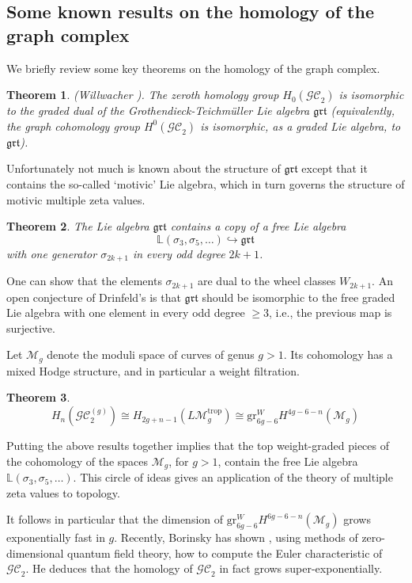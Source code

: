 \documentclass[12pt]{amsart}
\theoremstyle{plain}
\newtheorem{thm}{Theorem}
\newcommand{\LM}{L\mathcal{M}}
\newcommand{\trop}{\mathrm{trop}}
\newcommand{\GC}{\mathcal{GC}}
\newcommand{\0}{\color{blue}{\mathsf{0}}}
\begin{document}
\subsection{Some known results on the homology of the graph complex}
We briefly review some key theorems on  the homology of the graph complex. 
\begin{thm} (Willwacher \cite{WillwacherGRT}). The zeroth homology group $H_0(\GC_2)$ is isomorphic to the graded dual of the Grothendieck-Teichm\"uller Lie algebra $\mathfrak{grt}$ (equivalently, the graph cohomology group $H^0(\GC_2)$ is isomorphic, as a graded Lie algebra, to $\mathfrak{grt}$). 
\end{thm}
Unfortunately not much is known about the structure of $\mathfrak{grt}$ except that it contains the so-called `motivic' Lie algebra, which in turn governs the structure of motivic multiple zeta values. 

\begin{thm}  \label{thm: BrownFreeness} The Lie algebra $\mathfrak{grt}$  contains a copy of a free Lie algebra 
\[ \mathbb{L}(\sigma_3,\sigma_5,\ldots ) \hookrightarrow  \mathfrak{grt}\]
with one generator $\sigma_{2k+1}$ in every odd degree $2k+1$.  
\end{thm}
One can show that the elements $\sigma_{2k+1}$ are dual to the wheel classes $W_{2k+1}$. 
An open conjecture of Drinfeld's is that $\mathfrak{grt}$ should be isomorphic to the free graded Lie algebra with one element in every odd degree $\geq 3$, i.e., the previous map is surjective. 


Let $\mathcal{M}_g$ denote the moduli space of curves of genus $g>1$. Its cohomology has a mixed Hodge structure, and in particular a weight filtration. 

\begin{thm} \cite{CGP} \[  H_n(\GC_2^{(g)}) \cong  H_{2g+n-1}(\LM_g^{\trop}) \cong \mathrm{gr}^W_{6g-6} H^{4g-6-n}( \mathcal{M}_g)\] 

\end{thm}

Putting the above results together implies that  the    top weight-graded pieces of the cohomology of the spaces  $\mathcal{M}_g$, for $g>1$,  contain the free Lie algebra $\mathbb{L}(\sigma_3,\sigma_5,\ldots )$.
This circle of ideas gives an application of the theory of multiple zeta values to topology. 


It follows in particular that the dimension of  $\mathrm{gr}^W_{6g-6} H^{6g-6-n}( \mathcal{M}_g)$ grows exponentially fast in $g$. Recently, Borinsky has shown \cite{BorinskyEulerChar}, using methods of zero-dimensional quantum field theory, how to compute the Euler characteristic of $\GC_2$. He deduces that the homology of $\GC_2$ in fact grows super-exponentially. 
\end{document}
